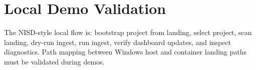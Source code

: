 \section{Local Demo Validation}
The NISD-style local flow is: bootstrap project from landing, select project, scan landing, dry-run ingest, run ingest, verify dashboard updates, and inspect diagnostics. Path mapping between Windows host and container landing paths must be validated during demos.

